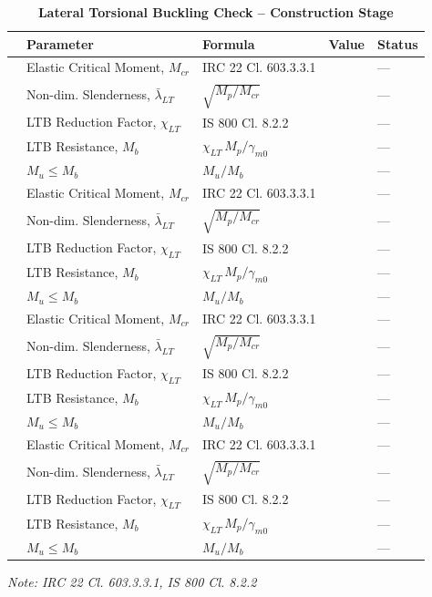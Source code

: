 \documentclass[12pt,a4paper]{report}
\numberwithin{table}{chapter}
\numberwithin{figure}{chapter}
\begin{document}
\vspace{1em}
\begin{longtable}{|C{2.5cm}|C{3.5cm}|C{3.5cm}|>{\centering\arraybackslash}p{4.2cm}|C{1.8cm}|}
\caption{\textbf{Lateral Torsional Buckling Check -- Construction Stage}} \\
\hline
\textbf{} & \textbf{Parameter} & \textbf{Formula} & \textbf{Value} & \textbf{Status} \\[6pt]
\hline
{} & Elastic Critical Moment, $M_{cr}$ & IRC 22 Cl. 603.3.3.1 &  & --- \\[6pt]
 & Non-dim. Slenderness, $\bar{\lambda}_{LT}$ & $\sqrt{M_p / M_{cr}}$ &  & --- \\[6pt]
 & LTB Reduction Factor, $\chi_{LT}$ & IS 800 Cl. 8.2.2 &  & --- \\[6pt]
 & LTB Resistance, $M_b$ & $\chi_{LT}\,M_p / \gamma_{m0}$ &  & --- \\[6pt]
 & $M_u \leq M_b$ & $M_u / M_b$ &  & --- \\[6pt]
\hline
{} & Elastic Critical Moment, $M_{cr}$ & IRC 22 Cl. 603.3.3.1 &  & --- \\[6pt]
 & Non-dim. Slenderness, $\bar{\lambda}_{LT}$ & $\sqrt{M_p / M_{cr}}$ &  & --- \\[6pt]
 & LTB Reduction Factor, $\chi_{LT}$ & IS 800 Cl. 8.2.2 &  & --- \\[6pt]
 & LTB Resistance, $M_b$ & $\chi_{LT}\,M_p / \gamma_{m0}$ &  & --- \\[6pt]
 & $M_u \leq M_b$ & $M_u / M_b$ &  & --- \\[6pt]
\hline
{} & Elastic Critical Moment, $M_{cr}$ & IRC 22 Cl. 603.3.3.1 &  & --- \\[6pt]
 & Non-dim. Slenderness, $\bar{\lambda}_{LT}$ & $\sqrt{M_p / M_{cr}}$ &  & --- \\[6pt]
 & LTB Reduction Factor, $\chi_{LT}$ & IS 800 Cl. 8.2.2 &  & --- \\[6pt]
 & LTB Resistance, $M_b$ & $\chi_{LT}\,M_p / \gamma_{m0}$ &  & --- \\[6pt]
 & $M_u \leq M_b$ & $M_u / M_b$ &  & --- \\[6pt]
\hline
{} & Elastic Critical Moment, $M_{cr}$ & IRC 22 Cl. 603.3.3.1 &  & --- \\[6pt]
 & Non-dim. Slenderness, $\bar{\lambda}_{LT}$ & $\sqrt{M_p / M_{cr}}$ &  & --- \\[6pt]
 & LTB Reduction Factor, $\chi_{LT}$ & IS 800 Cl. 8.2.2 &  & --- \\[6pt]
 & LTB Resistance, $M_b$ & $\chi_{LT}\,M_p / \gamma_{m0}$ &  & --- \\[6pt]
 & $M_u \leq M_b$ & $M_u / M_b$ &  & --- \\[6pt]
\hline
\end{longtable}
\noindent\textit{Note: IRC 22 Cl. 603.3.3.1, IS 800 Cl. 8.2.2}
\end{document}
